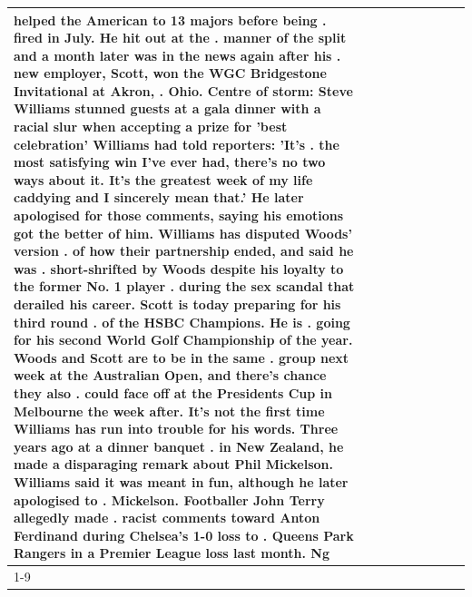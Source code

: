 \begin{table}[H]
\begin{tabular}{lllrlllll}
helped the American to 13 majors before being . fired in July. He hit out at the . manner of the split and a month later was in the news again after his . new employer, Scott, won the WGC Bridgestone Invitational at Akron, . Ohio. Centre of storm: Steve Williams stunned guests at a gala dinner with a racial slur when accepting a prize for 'best celebration' Williams had told reporters: 'It's . the most satisfying win I've ever had, there's no two ways about it. It's the greatest week of my life caddying and I sincerely mean that.' He later apologised for those comments, saying his emotions got the better of him. Williams has disputed Woods' version . of how their partnership ended, and said he was . short-shrifted by Woods despite his loyalty to the former No. 1 player . during the sex scandal that derailed his career. Scott is today preparing for his third round . of the HSBC Champions. He is . going for his second World Golf Championship of the year. Woods and Scott are to be in the same . group next week at the Australian Open, and there's chance they also . could face off at the Presidents Cup in Melbourne the week after. It's not the first time Williams has run into trouble for his words. Three years ago at a dinner banquet . in New Zealand, he made a disparaging remark about Phil Mickelson. Williams said it was meant in fun, although he later apologised to . Mickelson. Footballer John Terry allegedly made . racist comments toward Anton Ferdinand during Chelsea's 1-0 loss to . Queens Park Rangers in a Premier League loss last month. Ng \\
\cline{1-9}

\end{tabular}
\end{table}

